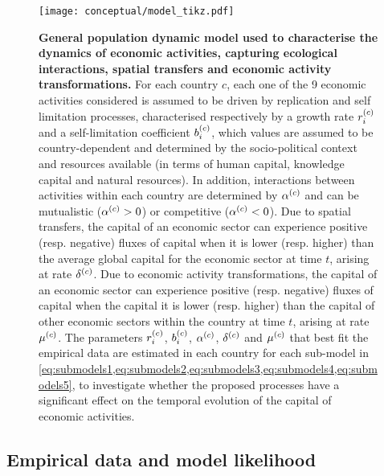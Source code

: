 \begin{figure}[ht]
  \texttt{[image: conceptual/model\_tikz.pdf]}
  \centering
  \caption{\small
      \textbf{General population dynamic model used to characterise the dynamics of economic activities, capturing ecological interactions, spatial transfers and economic activity transformations.}
      For each country $c$, each one of the 9 economic activities considered is assumed to be driven by replication and self limitation processes, characterised respectively by a growth rate $r_i^{(c)}$ and a self-limitation coefficient $b_i^{(c)}$, which values are assumed to be country-dependent and determined by the socio-political context and resources available (in terms of human capital, knowledge capital and natural resources). 
      In addition, interactions between activities within each country are determined by $\alpha^{(c)}$ and can be mutualistic ($\alpha^{(c)} > 0$) or competitive ($\alpha^{(c)}< 0$).
      Due to spatial transfers, the capital of an economic sector can experience positive (resp. negative) fluxes of capital when it is lower (resp. higher) than the average global capital for the economic sector at time $t$, arising at rate $\delta^{(c)}$.
      Due to economic activity transformations, the capital of an economic sector can experience positive (resp. negative) fluxes of capital when the capital it is lower (resp. higher) than the capital of other economic sectors within the country at time $t$, arising at rate $\mu^{(c)}$.
      The parameters $r_i^{(c)}$, $b_i^{(c)}$, $\alpha^{(c)}$, $\delta^{(c)}$ and $\mu^{(c)}$ that best fit the empirical data are estimated in each country for each sub-model in \cref{eq:submodels1,eq:submodels2,eq:submodels3,eq:submodels4,eq:submodels5}, to investigate whether the proposed processes have a significant effect on the temporal evolution of the capital of economic activities.
      }\label{fig:model}
\end{figure}
\FloatBarrier

    
\subsection{Empirical data and model likelihood}

